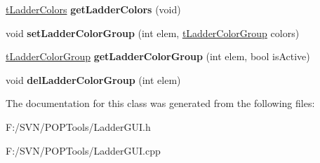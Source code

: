 \begin{DoxyCompactItemize}
\item 
\hypertarget{class_ladder_g_u_i_afb9e72e9c42c974660b7548258e8bc75}{\hyperlink{structt_ladder_colors}{t\-Ladder\-Colors} {\bfseries get\-Ladder\-Colors} (void)}\label{class_ladder_g_u_i_afb9e72e9c42c974660b7548258e8bc75}

\item 
\hypertarget{class_ladder_g_u_i_a8ae195d8e744527a66df8364d4257dc8}{void {\bfseries set\-Ladder\-Color\-Group} (int elem, \hyperlink{structt_ladder_color_group}{t\-Ladder\-Color\-Group} colors)}\label{class_ladder_g_u_i_a8ae195d8e744527a66df8364d4257dc8}

\item 
\hypertarget{class_ladder_g_u_i_aab353d16545fad16a87049d595cd5c68}{\hyperlink{structt_ladder_color_group}{t\-Ladder\-Color\-Group} {\bfseries get\-Ladder\-Color\-Group} (int elem, bool is\-Active)}\label{class_ladder_g_u_i_aab353d16545fad16a87049d595cd5c68}

\item 
\hypertarget{class_ladder_g_u_i_a71f4021a55ee45e038432e73c1e24402}{void {\bfseries del\-Ladder\-Color\-Group} (int elem)}\label{class_ladder_g_u_i_a71f4021a55ee45e038432e73c1e24402}

\end{DoxyCompactItemize}


The documentation for this class was generated from the following files\-:\begin{DoxyCompactItemize}
\item 
F\-:/\-S\-V\-N/\-P\-O\-P\-Tools/Ladder\-G\-U\-I.\-h\item 
F\-:/\-S\-V\-N/\-P\-O\-P\-Tools/Ladder\-G\-U\-I.\-cpp\end{DoxyCompactItemize}
